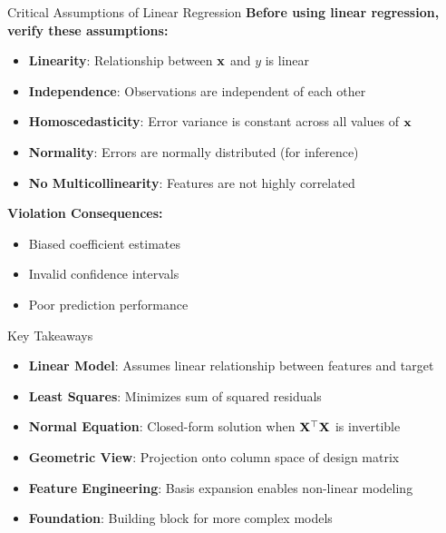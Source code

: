 \documentclass{beamer}
\begin{document}
\begin{frame}{Critical Assumptions of Linear Regression}
\textbf{Before using linear regression, verify these assumptions:}
\begin{itemize}[<+->]
\item \textbf{Linearity}: Relationship between $\mathbf{x}$ and $y$ is linear
\item \textbf{Independence}: Observations are independent of each other
\item \textbf{Homoscedasticity}: Error variance is constant across all values of $\mathbf{x}$
\item \textbf{Normality}: Errors are normally distributed (for inference)
\item \textbf{No Multicollinearity}: Features are not highly correlated
\end{itemize}

\pause
\textbf{Violation Consequences:}
\begin{itemize}[<+->]
\item Biased coefficient estimates
\item Invalid confidence intervals
\item Poor prediction performance
\end{itemize}
\end{frame}

\begin{frame}{Key Takeaways}
\begin{itemize}[<+->]
\item \textbf{Linear Model}: Assumes linear relationship between features and target
\item \textbf{Least Squares}: Minimizes sum of squared residuals
\item \textbf{Normal Equation}: Closed-form solution when $\mathbf{X}^\top\mathbf{X}$ is invertible
\item \textbf{Geometric View}: Projection onto column space of design matrix
\item \textbf{Feature Engineering}: Basis expansion enables non-linear modeling
\item \textbf{Foundation}: Building block for more complex models
\end{itemize}
\end{frame}
\end{document}
